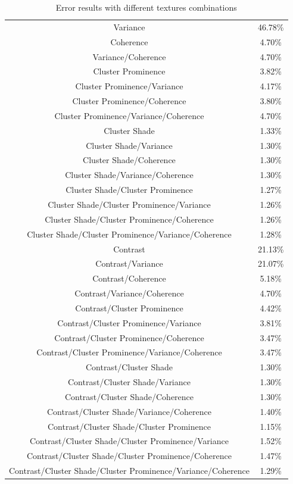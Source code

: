 \begin{table}[H]
\centering
\begin{tabular}{ |c |c |}
 \hline
     Variance & 46.78\% \\
     Coherence & 4.70\% \\
     Variance/Coherence & 4.70\% \\
     Cluster Prominence & 3.82\% \\
     Cluster Prominence/Variance & 4.17\% \\
     Cluster Prominence/Coherence & 3.80\% \\
     Cluster Prominence/Variance/Coherence & 4.70\% \\
     Cluster Shade & 1.33\% \\
     Cluster Shade/Variance & 1.30\% \\
     Cluster Shade/Coherence & 1.30\% \\
     Cluster Shade/Variance/Coherence & 1.30\% \\
     Cluster Shade/Cluster Prominence & 1.27\% \\
     Cluster Shade/Cluster Prominence/Variance & 1.26\% \\
     Cluster Shade/Cluster Prominence/Coherence & 1.26\% \\
     Cluster Shade/Cluster Prominence/Variance/Coherence & 1.28\% \\
     Contrast & 21.13\% \\
     Contrast/Variance & 21.07\% \\
     Contrast/Coherence & 5.18\% \\
     Contrast/Variance/Coherence & 4.70\% \\
     Contrast/Cluster Prominence & 4.42\% \\
     Contrast/Cluster Prominence/Variance & 3.81\% \\
     Contrast/Cluster Prominence/Coherence & 3.47\% \\
     Contrast/Cluster Prominence/Variance/Coherence & 3.47\% \\
     Contrast/Cluster Shade & 1.30\% \\
     Contrast/Cluster Shade/Variance & 1.30\% \\
     Contrast/Cluster Shade/Coherence & 1.30\% \\
     Contrast/Cluster Shade/Variance/Coherence & 1.40\% \\
     Contrast/Cluster Shade/Cluster Prominence & 1.15\% \\
     Contrast/Cluster Shade/Cluster Prominence/Variance & 1.52\% \\
     Contrast/Cluster Shade/Cluster Prominence/Coherence & 1.47\% \\
     Contrast/Cluster Shade/Cluster Prominence/Variance/Coherence & 1.29\% \\
 \hline
\end{tabular}
\caption{Error results with different textures combinations}
\label{table:accuracy_results_tandem}
\end{table}

